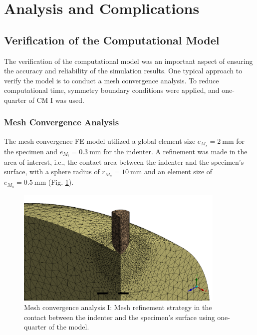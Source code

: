 \section{Analysis and Complications}
\label{section:challengescm}
\subsection{Verification of the Computational Model}
The verification of the computational model was an important aspect of ensuring the accuracy and reliability of the 
simulation results. One typical approach to verify the model is to conduct a mesh convergence analysis. To 
reduce computational time, symmetry boundary conditions were applied, and one-quarter of CM I was used.

\subsubsection*{Mesh Convergence Analysis}
The mesh convergence FE model utilized a global element size $e_{M_s}=\SI{2}{\milli\meter}$ for the specimen
and $e_{M_i}=\SI{0.3}{\milli\meter}$ for the indenter.
A refinement was made in the area of interest, i.e., the contact area between the indenter and the specimen's surface,
with a sphere radius of $r_{M_a}=\SI{10}{\milli\meter}$ and an element size of $e_{M_a}=\SI{0.5}{\milli\meter}$ (Fig. \ref{fig:meshconvergencecmI}).

\begin{figure}%
    \centering
   \quad
   \includegraphics[width=10cm]{Images/computational/meshzoom.png}%
   \caption[Mesh convergence model I]{Mesh convergence analysis I: Mesh refinement strategy in the contact between the indenter and the specimen's surface using one-quarter of the model.}%
   \label{fig:meshconvergencecmI}%
\end{figure}

